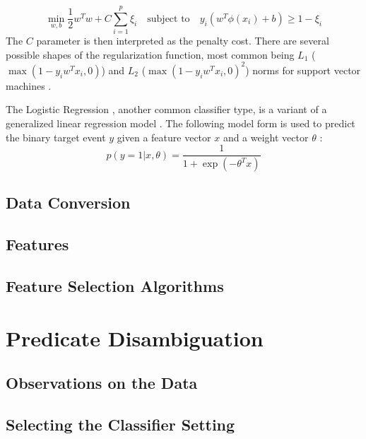 \documentclass[12pt,notitlepage]{report}
\begin{document}
\begin{equation}
\min_{w,b} \frac{1}{2}w^T w + C\sum_{i=1}^p \xi_i \quad\mbox{subject to}\quad y_i(w^T\phi(x_i) + b)\geq 1 - \xi_i
\end{equation}
The $C$ parameter is then interpreted as the penalty cost. There are several possible shapes of the regularization function, most common being $L_1$ ($\max(1-y_i w^T x_i, 0)$) and $L_2$ ($\max(1-y_i w^T x_i, 0)^2$) norms for support vector machines \citep{fan08}.

The Logistic Regression \citep{hosmer00}, another common classifier type, is a variant of a generalized linear regression model \citep{maccullagh91}. The following model form is used to predict the binary target event $y$ given a feature vector $x$ and a weight vector $\theta$ \citep{lee06}:
\begin{equation}
p(y = 1|x,\theta) = \frac{1}{1 + \exp(-\theta^T x)}
\end{equation}


\section{Data Conversion}\label{conversion}
\section{Features}\label{features}
\section{Feature Selection Algorithms}\label{featsel}

\chapter{Predicate Disambiguation}\label{pd}
\section{Observations on the Data}
\section{Selecting the Classifier Setting}\label{classifier-setting}
\end{document}
